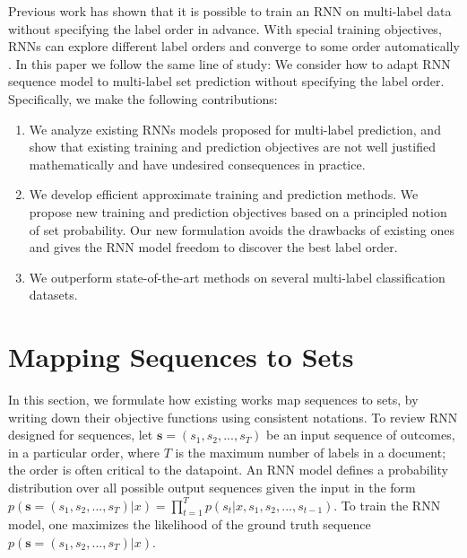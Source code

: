 Previous work has shown that it is possible to train an RNN on multi-label data without specifying the label order in advance. With special training objectives, RNNs can explore different label orders and converge to some order automatically \cite{vinyals2015order}. In this paper we follow the same line of study: We consider how to adapt RNN sequence model to multi-label set prediction without specifying the label order. Specifically, we make the following  contributions:
\begin{enumerate}
\item We analyze existing RNNs models proposed for multi-label prediction, and show that existing training and prediction objectives are not well justified mathematically and have undesired consequences in practice. 
\item  We develop efficient approximate training and prediction methods. We propose new training and prediction objectives based on a principled notion of set probability. Our new formulation avoids the drawbacks of existing ones and gives  the  RNN  model  freedom  to discover the best label order. 
\item We outperform state-of-the-art methods on several multi-label classification datasets.
\end{enumerate}

\section{Mapping Sequences to Sets} 
In this section, we formulate how existing works map sequences to sets, by writing down their objective functions using consistent notations. To review RNN designed for sequences, let $\mathbf{s}=(s_1,s_2,...,s_T)$ be an input sequence of outcomes, in a particular order, where $T$ is the maximum number of labels in a document; the order is often critical to the datapoint. An RNN model defines a probability distribution over all possible output sequences given the input in the form $p(\mathbf{s}=(s_1,s_2,...,s_T)|x)=\prod_{t=1}^T p(s_t|x,s_1,s_2,...,s_{t-1})$. To train the RNN model, one maximizes the likelihood of the ground truth sequence $p(\mathbf{s}=(s_1,s_2,...,s_T)|x)$.

